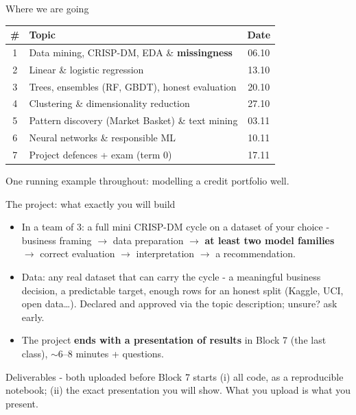 \documentclass[10pt,aspectratio=169]{beamer}
\begin{document}
\begin{frame}{Where we are going}
  \small
  \begin{center}
  \begin{tabular}{@{}clc@{}}
    \toprule
    \# & Topic & Date \\
    \midrule
    1 & Data mining, CRISP-DM, EDA \& \textbf{missingness} & 06.10 \\
    2 & Linear \& logistic regression & 13.10 \\
    3 & Trees, ensembles (RF, GBDT), honest evaluation & 20.10 \\
    4 & Clustering \& dimensionality reduction & 27.10 \\
    5 & Pattern discovery (Market Basket) \& text mining & 03.11 \\
    6 & Neural networks \& responsible ML & 10.11 \\
    7 & Project defences + exam (term 0) & 17.11 \\
    \bottomrule
  \end{tabular}
  \end{center}
  \vspace{0.6em}
  \begin{center}\alert{One running example throughout: modelling a credit portfolio well.}\end{center}
\end{frame}

\begin{frame}{The project: what exactly you will build}
  \begin{itemize}
    \item In a \alert{team of 3}: a full mini CRISP-DM cycle on a dataset
          of \alert{your choice} - business framing $\to$ data preparation
          $\to$ \textbf{at least two model families} $\to$ correct
          evaluation $\to$ interpretation $\to$ a recommendation.
    \item Data: any real dataset that can carry the cycle - a meaningful
          business decision, a predictable target, enough rows for an
          honest split (Kaggle, UCI, open data\ldots). Declared and
          approved via the topic description; unsure? ask early.
    \item The project \textbf{ends with a presentation of results} in
          Block 7 (the last class), $\sim$6--8 minutes + questions.
  \end{itemize}
  \vspace{0.4em}
  \begin{block}{Deliverables - both uploaded \alert{before} Block 7 starts}
    (i) all code, as a reproducible notebook; (ii) the exact presentation
    you will show. What you upload is what you present.
  \end{block}
\end{frame}
\end{document}
